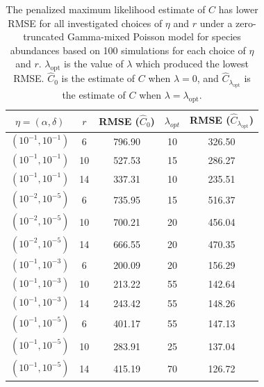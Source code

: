 \documentclass[12pt]{article}
\begin{document}
\begin{table}[t]
\caption{The penalized maximum likelihood estimate of $C$ has lower RMSE for all investigated choices of $\eta$ and $r$ under a zero-truncated Gamma-mixed Poisson model for species abundances based on 100 simulations for each choice of $\eta$ and $r$.
$\lambda_{\text{opt}}$ is the value of $\lambda$ which produced the lowest RMSE.
$\widehat{C}_0$ is the estimate of $C$ when $\lambda = 0$, and $\widehat{C}_{\lambda_{\text{opt}}}$ is the estimate of $C$ when $\lambda = \lambda_{\text{opt}}$.
\label{tab:fixed_lambda_results}}
\centering
\begin{tabular}{ccccc}
  \hline
$\eta = (\alpha, \delta)$ & $r$ & RMSE ($\widehat{C}_{0}$) & $\lambda_{opt}$ & RMSE ($\widehat{C}_{\lambda_{ \text{opt}}}$) \\
  \hline
$\left(10^{-1}, 10^{-1}\right)$ &   6 & 796.90 &  10 & 326.50 \\
$\left(10^{-1}, 10^{-1}\right)$ &  10 & 527.53 &  15 & 286.27 \\
  $\left(10^{-1}, 10^{-1}\right)$ &  14 & 337.31 &  10 & 235.51 \\
  $\left(10^{-2}, 10^{-5}\right)$ &   6 & 735.95 &  15 & 516.37 \\
  $\left(10^{-2}, 10^{-5}\right)$ &  10 & 700.21 &  20 & 456.04 \\
  $\left(10^{-2}, 10^{-5}\right)$ &  14 & 666.55 &  20 & 470.35 \\
  $\left(10^{-1}, 10^{-3}\right)$ &   6 & 200.09 &  20 & 156.29 \\
  $\left(10^{-1}, 10^{-3}\right)$ &  10 & 213.22 &  55 & 142.64 \\
  $\left(10^{-1}, 10^{-3}\right)$ &  14 & 243.42 &  55 & 148.26 \\
  $\left(10^{-1}, 10^{-5}\right)$ &   6 & 401.17 &  55 & 147.13 \\
  $\left(10^{-1}, 10^{-5}\right)$ &  10 & 283.91 &  25 & 137.04 \\
  $\left(10^{-1}, 10^{-5}\right)$ &  14 & 415.19 &  70 & 126.72 \\
   \hline
\end{tabular}
\end{table}

\end{document}
